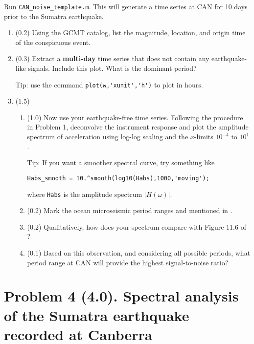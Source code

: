 \documentclass[11pt,titlepage,fleqn]{article}
\begin{document}
Run \verb+CAN_noise_template.m+. This will generate a time series at CAN for 10 days prior to the Sumatra earthquake.

\begin{enumerate}
\item (0.2) Using the GCMT catalog, list the magnitude, location, and origin time of the conspicuous event. 

\item (0.3) Extract a {\bf multi-day} time series that does not contain any earthquake-like signals. Include this plot. What is the dominant period?

Tip: use the command \verb+plot(w,'xunit','h')+ to plot in hours.

\item (1.5)

\begin{enumerate}
\item (1.0) Now use your earthquake-free time series. Following the procedure in Problem 1, deconvolve the instrument response and plot the amplitude spectrum of acceleration using log-log scaling and the $x$-limits $10^{-4}$ to $10^1$.

Tip: If you want a smoother spectral curve, try something like

\noindent
\verb+Habs_smooth = 10.^smooth(log10(Habs),1000,'moving');+

\noindent
where \verb+Habs+ is the amplitude spectrum $|H(\omega)|$.

\item (0.2) Mark the ocean microseismic period ranges  and  mentioned in \citet[][Section 11.2]{ShearerE2}.

\item (0.2) Qualitatively, how does your spectrum compare with Figure 11.6 of \citet{ShearerE2}?

\item (0.1) Based on this observation, and considering all possible periods, what period range at CAN will provide the highest signal-to-noise ratio?

\end{enumerate}

\end{enumerate}


\section*{Problem 4 (4.0). Spectral analysis of the Sumatra earthquake recorded at Canberra}
\end{document}
